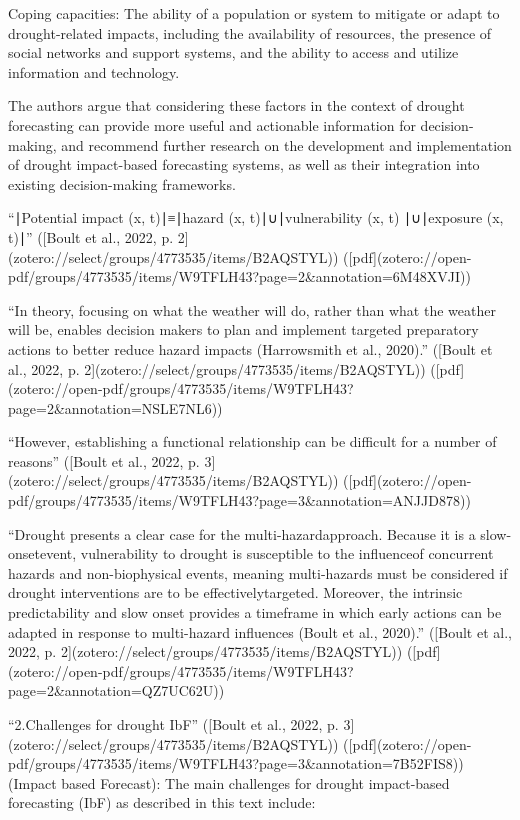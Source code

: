 {Coping capacities: The ability of a population or system to mitigate or adapt to drought-related impacts, including the availability of resources, the presence of social networks and support systems, and the ability to access and utilize information and technology.

The authors argue that considering these factors in the context of drought forecasting can provide more useful and actionable information for decision-making, and recommend further research on the development and implementation of drought impact-based forecasting systems, as well as their integration into existing decision-making frameworks.


“∣Potential impact (x, t)∣≡∣hazard (x, t)∣∪∣vulnerability (x, t) ∣∪∣exposure (x, t)∣” ([Boult et al., 2022, p. 2](zotero://select/groups/4773535/items/B2AQSTYL)) ([pdf](zotero://open-pdf/groups/4773535/items/W9TFLH43?page=2&annotation=6M48XVJI))

“In theory, focusing on what the weather will do, rather than what the weather will be, enables decision makers to plan and implement targeted preparatory actions to better reduce hazard impacts (Harrowsmith et al., 2020).” ([Boult et al., 2022, p. 2](zotero://select/groups/4773535/items/B2AQSTYL)) ([pdf](zotero://open-pdf/groups/4773535/items/W9TFLH43?page=2&annotation=NSLE7NL6))

“However, establishing a functional relationship can be difficult for a number of reasons” ([Boult et al., 2022, p. 3](zotero://select/groups/4773535/items/B2AQSTYL)) ([pdf](zotero://open-pdf/groups/4773535/items/W9TFLH43?page=3&annotation=ANJJD878))

“Drought presents a clear case for the multi-hazardapproach. Because it is a slow-onsetevent, vulnerability to drought is susceptible to the influenceof concurrent hazards and non-biophysical events, meaning multi-hazards must be considered if drought interventions are to be effectivelytargeted. Moreover, the intrinsic predictability and slow onset provides a timeframe in which early actions can be adapted in response to multi-hazard influences (Boult et al., 2020).” ([Boult et al., 2022, p. 2](zotero://select/groups/4773535/items/B2AQSTYL)) ([pdf](zotero://open-pdf/groups/4773535/items/W9TFLH43?page=2&annotation=QZ7UC62U))

“2.Challenges for drought IbF” ([Boult et al., 2022, p. 3](zotero://select/groups/4773535/items/B2AQSTYL)) ([pdf](zotero://open-pdf/groups/4773535/items/W9TFLH43?page=3&annotation=7B52FIS8)) (Impact based Forecast):
The main challenges for drought impact-based forecasting (IbF) as described in this text include:

}
